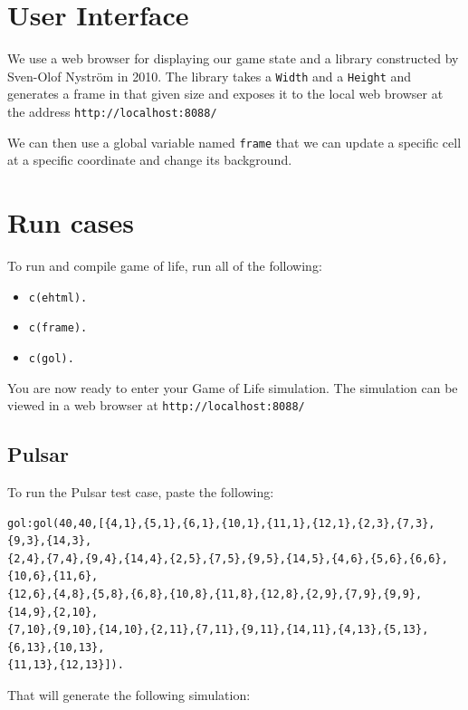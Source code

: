 \documentclass[a4paper,11pt]{article}
\begin{document}
\section{User Interface}
We use a web browser for displaying our game state and a library constructed by Sven-Olof Nyström in 2010. The library takes a \texttt{Width} and a \texttt{Height} and generates a frame in that given size and exposes it to the local web browser at the address \texttt{http://localhost:8088/}

We can then use a global variable named \texttt{frame} that we can update a specific cell at a specific coordinate and change its background.

\section{Run cases}
To run and compile game of life, run all of the following:
\begin{itemize}
\item \texttt{c(ehtml).}
\item \texttt{c(frame).} 
\item \texttt{c(gol).}
\end{itemize}

You are now ready to enter your Game of Life simulation. The simulation can be viewed in a web browser at \texttt{http://localhost:8088/}

\subsection{Pulsar}
To run the Pulsar test case, paste the following:

\begin{verbatim}
gol:gol(40,40,[{4,1},{5,1},{6,1},{10,1},{11,1},{12,1},{2,3},{7,3},{9,3},{14,3},
{2,4},{7,4},{9,4},{14,4},{2,5},{7,5},{9,5},{14,5},{4,6},{5,6},{6,6},{10,6},{11,6},
{12,6},{4,8},{5,8},{6,8},{10,8},{11,8},{12,8},{2,9},{7,9},{9,9},{14,9},{2,10},
{7,10},{9,10},{14,10},{2,11},{7,11},{9,11},{14,11},{4,13},{5,13},{6,13},{10,13},
{11,13},{12,13}]).
\end{verbatim}

\noindent That will generate the following simulation:
\end{document}
